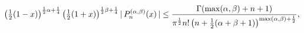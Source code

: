 \[\left(\tfrac{1}{2}(1-x)\right)^{\frac{1}{2}\alpha+\frac{1}{4}}\left(\tfrac{1}{%
2}(1+x)\right)^{\frac{1}{2}\beta+\frac{1}{4}}|\mathop{P^{(\alpha,\beta)}_{n}\/%
}\nolimits\!\left(x\right)|\leq\frac{\mathop{\Gamma\/}\nolimits\!\left(\max(%
\alpha,\beta)+n+1\right)}{\pi^{\frac{1}{2}}n!\left(n+\tfrac{1}{2}(\alpha+\beta%
+1)\right)^{\max(\alpha,\beta)+\frac{1}{2}}},\]